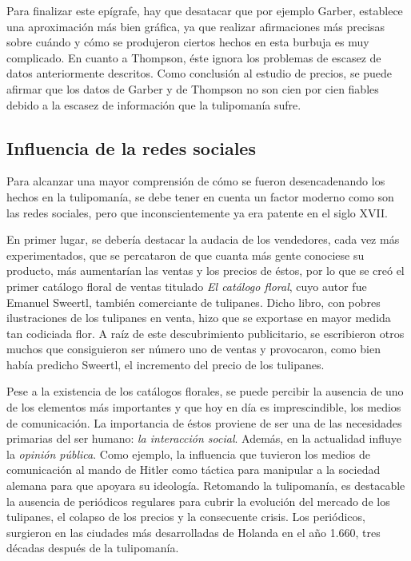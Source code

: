 Para finalizar este epígrafe, hay que desatacar que por ejemplo Garber, establece una aproximación más bien gráfica, ya que realizar afirmaciones más precisas sobre cuándo y cómo se produjeron ciertos hechos en esta burbuja es muy complicado. En cuanto a Thompson, éste ignora los problemas de escasez de datos anteriormente descritos. Como conclusión al estudio de precios, se puede afirmar que los datos de Garber y de Thompson no son cien por cien fiables debido a la escasez de información que la tulipomanía sufre. 


\subsection{Influencia de la redes sociales} 

Para alcanzar una mayor comprensión de cómo se fueron desencadenando los hechos en la tulipomanía, se debe tener en cuenta un factor moderno como son las redes sociales, pero que inconscientemente ya era patente en el siglo XVII.

En primer lugar, se debería destacar la audacia de los vendedores, cada vez más experimentados, que se percataron de que cuanta más gente conociese su producto, más aumentarían las ventas y los precios de éstos, por lo que se creó el primer catálogo floral de ventas titulado \emph{El catálogo floral}, cuyo autor fue Emanuel Sweertl, también comerciante de tulipanes. Dicho libro, con pobres ilustraciones de los tulipanes en venta, hizo que se exportase en mayor medida tan codiciada flor. A raíz de este descubrimiento publicitario, se escribieron otros muchos que consiguieron ser número uno de ventas y provocaron, como bien había predicho Sweertl, el incremento del precio de los tulipanes.

Pese a la existencia de los catálogos florales, se puede percibir la ausencia de uno de los elementos más importantes y que hoy en día es imprescindible, los medios de comunicación. La importancia de éstos proviene de ser una de las necesidades primarias del ser humano: \emph{la interacción social}. Además, en la actualidad influye la \emph{opinión pública}. Como ejemplo, la influencia que tuvieron los medios de comunicación al mando de   Hitler como táctica para manipular a la sociedad alemana para que apoyara su ideología. Retomando la tulipomanía, es destacable la ausencia de periódicos regulares para cubrir la evolución del mercado de los tulipanes, el colapso de los precios y la consecuente crisis. Los periódicos, surgieron en las ciudades más desarrolladas de Holanda en el año 1.660, tres décadas después de la tulipomanía.

